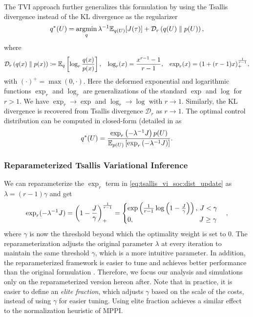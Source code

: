 \documentclass[twoside,11pt]{article}
\begin{document}
The \ac{TVI} approach \citep{wang2021variational} further generalizes this formulation by using the Tsallis divergence \citep{tsallis1988possible} instead of the KL divergence as the regularizer
\begin{equation}\label{eq: tvo_obj}
q^*(U) = \argmin_q \lambda^{-1}\Eb_{q(U)}[J(\tau)] + \D{r}{q(U)}{p(U)},
\end{equation}
where
\begin{equation*}
\mathcal{D}_{r}\left({q(x)}\parallel {p(x)}\right) \coloneqq  \mathbb{E}_q\left[\log_r\frac{q(x)}{p(x)}\right], \hspace{3mm} \log_r(x) = \frac{x^{r-1}-1}{r-1} , \hspace{3mm}
\exp_r(x) = (1+(r-1)x)_+^{\frac{1}{r-1}},
\end{equation*}
with $(\cdot)^+=\max(0, \cdot)$. Here the deformed exponential and logarithmic functions $\exp_r$ and $\log_r$ are generalizations of the standard $\exp$ and $\log$ for $r>1$. We have $\exp_r\rightarrow\exp$ and $\log_r\rightarrow\log$ with $r\rightarrow 1$. Similarly, the KL divergence is recovered from Tsallis divergence $\mathcal{D}_r$ as $r\rightarrow 1$. The optimal control distribution can be computed in closed-form (detailed in  as
\begin{equation}\label{eq:tsallis_vi_soc:dist_update}
q^*(U)
=\frac{\exp_r \left( -\lambda^{-1} J\right)p(U)} {\mathbb{E}_{p(U)}\left[\exp_r \left( -\lambda^{-1} J\right)\right]}.
\end{equation}

\subsubsection{Reparameterized Tsallis Variational Inference}
\label{sec: reparameterized_tsallis}
We can reparameterize the $\exp_r$ term in \cref{eq:tsallis_vi_soc:dist_update} as $\lambda=(r-1)\gamma$ and get
\begin{equation}
\label{eq:reparameterization}
\exp_r(-\lambda^{-1} J) = \left(1-\frac{J}{\gamma}\right)_+^{\frac{1}{r-1}}
= \begin{cases}
\exp\left(\frac{1}{r-1}\log \left(1-\frac{J}{\gamma}\right)\right), \, J<\gamma \\
0, \hspace{9.6 em} J \geq \gamma
\end{cases},
\end{equation}
where $\gamma$ is now the threshold beyond which the optimality weight is set to 0.
The reparameterization adjusts the original parameter $\lambda$ at every iteration to maintain the same threshold $\gamma$, which is a more intuitive parameter.
In addition, the reparameterized framework is easier to tune and achieves better performance than the original formulation \citep{wang2021variational}. Therefore, we focus our analysis and simulations only on the reparameterized version hereon after. Note that in practice, it is easier to define an \textit{elite fraction}, which adjusts $\gamma$ based on the scale of the costs, instead of using $\gamma$ for easier tuning. Using elite fraction achieves a similar effect to the normalization heuristic of \ac{MPPI}.
\end{document}
